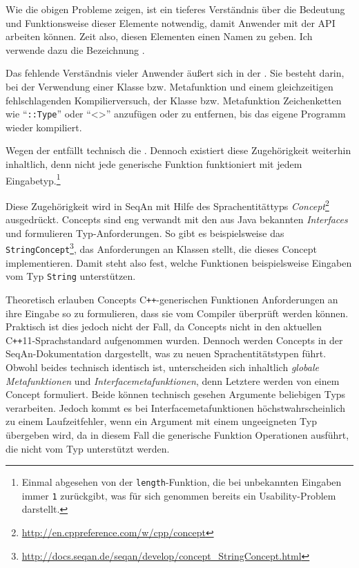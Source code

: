 \begin{itemize}
\begin{description}
    Wie die obigen Probleme zeigen, ist ein tieferes Verständnis über die Bedeutung und Funktionsweise dieser Elemente notwendig, damit Anwender mit der API arbeiten können. Zeit also, diesen Elementen einen Namen zu geben. Ich verwende dazu die Bezeichnung .
    
    Das fehlende Verständnis vieler Anwender äußert sich in der  . Sie besteht darin, bei der Verwendung einer Klasse bzw. Metafunktion und einem gleichzeitigen fehlschlagenden Kompilierversuch, der Klasse bzw. Metafunktion Zeichenketten wie ``\texttt{::Type}'' oder ``<>'' anzufügen oder zu entfernen, bis das eigene Programm wieder kompiliert. 
    
    Wegen der  entfällt technisch die . Dennoch existiert diese Zugehörigkeit weiterhin inhaltlich, denn nicht jede generische Funktion funktioniert mit jedem Eingabetyp.\footnote{Einmal abgesehen von der \texttt{length}-Funktion, die bei unbekannten Eingaben immer \texttt{1} zurückgibt, was für sich genommen bereits ein Usability-Problem darstellt.}
    
    Diese Zugehörigkeit wird in SeqAn mit Hilfe des Sprachentitättyps \textit{Concept}\footnote{\url{http://en.cppreference.com/w/cpp/concept}} ausgedrückt. Concepts sind eng verwandt mit den aus Java bekannten \textit{Interfaces} und formulieren Typ-Anforderungen. So gibt es beispielsweise das \texttt{StringConcept}\footnote{\url{http://docs.seqan.de/seqan/develop/concept_StringConcept.html}}, das Anforderungen an Klassen stellt, die dieses Concept implementieren. Damit steht also fest, welche Funktionen beispielsweise Eingaben vom Typ \texttt{String} unterstützen.
    
    Theoretisch erlauben Concepts C\texttt{++}-generischen Funktionen Anforderungen an ihre Eingabe so zu formulieren, dass sie vom Compiler überprüft werden können. Praktisch ist dies jedoch nicht der Fall, da Concepts nicht in den aktuellen C\texttt{++}11-Sprachstandard aufgenommen wurden. Dennoch werden Concepts in der SeqAn-Dokumentation dargestellt, was zu neuen Sprachentitätstypen führt. Obwohl beides technisch identisch ist, unterscheiden sich inhaltlich \textit{globale Metafunktionen} und \textit{Interfacemetafunktionen}, denn Letztere werden von einem Concept formuliert. Beide können technisch gesehen Argumente beliebigen Typs verarbeiten. Jedoch kommt es bei Interfacemetafunktionen höchstwahrscheinlich zu einem Laufzeitfehler, wenn ein Argument mit einem ungeeigneten Typ übergeben wird, da in diesem Fall die generische Funktion Operationen ausführt, die nicht vom Typ unterstützt werden.
    

\end{description}
\end{itemize}
